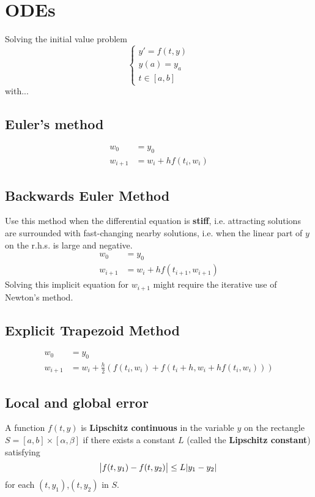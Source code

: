 \section{ODEs}
Solving the initial value problem
$$
\begin{cases}
y' = f(t,y) \\
y(a) = y_a \\
t \in [a,b]
\end{cases}
$$
with...
\subsection{Euler's method}
\begin{align*}
w_0 &= y_0 \\
w_{i+1} &= w_{i} + h f(t_i, w_i)
\end{align*}

\subsection{Backwards Euler Method}
Use this method when the differential equation is \textbf{stiff}, i.e. attracting solutions are surrounded with fast-changing nearby solutions, i.e. when the linear part of $y$ on the r.h.s. is large and negative.
\begin{align*}
w_0 &= y_0 \\
w_{i+1} &= w_{i} + h f(t_{i+1}, w_{i+1})
\end{align*}
Solving this implicit equation for $w_{i+1}$ might require the iterative use of Newton's method.
 
\subsection{Explicit Trapezoid Method}
\begin{align*}
w_0 &= y_0 \\
w_{i+1} &= w_i + \frac{h}{2}(f(t_i,w_i) + f(t_i + h, w_i + hf(t_i,w_i)))
\end{align*}

\subsection{Local and global error}
\begin{definition}
A function $f(t,y)$ is \textbf{Lipschitz continuous} in the variable $y$ on the rectangle $S = [a,b] \times [\alpha, \beta]$ if there exists a constant $L$ (called the \textbf{Lipschitz constant}) satisfying
$$
\abs{f(t,y_1) - f(t,y_2)} \leq L\abs{y_1 - y_2}
$$
for each $(t,y_1)$,$(t,y_2)$ in $S$.
\end{definition}

